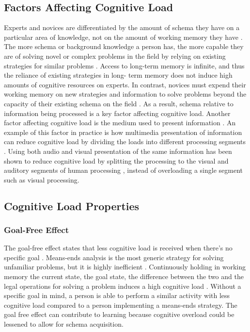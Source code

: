 \subsection{Factors Affecting Cognitive Load}
Experts and novices are differentiated by the amount of schema they have on a particular area of knowledge, not on the amount of working memory they have \cite{hart2006}. The more schema or background knowledge a person has, the more capable they are of solving novel or complex problems in the field by relying on existing strategies for similar problems \cite{hart2006}. Access to long-term memory is infinite, and thus the reliance of existing strategies in long- term memory does not induce high amounts of cognitive resources \cite{hart2006, sweller2019architecture} on experts. In contrast, novices must expend their working memory on new strategies and information to solve problems beyond the capacity of their existing schema on the field \cite{hart2006}. As a result, schema relative to information being processed is a key factor affecting cognitive load. Another factor affecting cognitive load is the medium used to present information \cite{sweller2019architecture}. An example of this factor in practice is how multimedia presentation of information can reduce cognitive load by dividing the loads into different processing segments \cite{sweller2011cognitive}. Using both audio and visual presentation of the same information has been shown to reduce cognitive load by splitting the processing to the visual and auditory segments of human processing \cite{sweller2011cognitive}, instead of overloading a single segment such as visual processing.

\subsection{Cognitive Load Properties}
\subsubsection{Goal-Free Effect}
The goal-free effect states that less cognitive load is received when there’s no specific goal \cite{sweller2019cognitive}. Means-ends analysis is the most generic strategy for solving unfamiliar problems, but it is highly inefficient \cite{hart2006}. Continuously holding in working memory the current state, the goal state, the difference between the two and the legal operations for solving a problem induces a high cognitive load \cite{hart2006}. Without a specific goal in mind, a person is able to perform a similar activity with less cognitive load compared to a person implementing a means-ends strategy. The goal free effect can contribute to learning because cognitive overload could be lessened to allow for schema acquisition.

